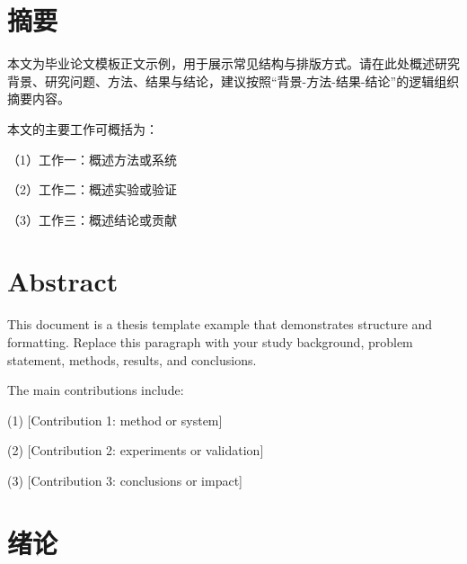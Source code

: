 \documentclass[unicode,master,submission,final]{scutthesis}
\begin{document}
\maketitle
\frontmatter
\ifmaincontent\else

\chapter{摘\texorpdfstring{\quad}{}要}

本文为毕业论文模板正文示例，用于展示常见结构与排版方式。请在此处概述研究背景、研究问题、方法、结果与结论，建议按照“背景-方法-结果-结论”的逻辑组织摘要内容。

本文的主要工作可概括为：

（1）工作一：概述方法或系统

（2）工作二：概述实验或验证

（3）工作三：概述结论或贡献


\chapter{Abstract}

This document is a thesis template example that demonstrates structure and formatting. Replace this paragraph with your study background, problem statement, methods, results, and conclusions.

The main contributions include:

(1) [Contribution 1: method or system]

(2) [Contribution 2: experiments or validation]

(3) [Contribution 3: conclusions or impact]


\tableofcontents
\fi

\mainmatter

\pagestyle{fancy}

\chapter{绪论}
\end{document}
